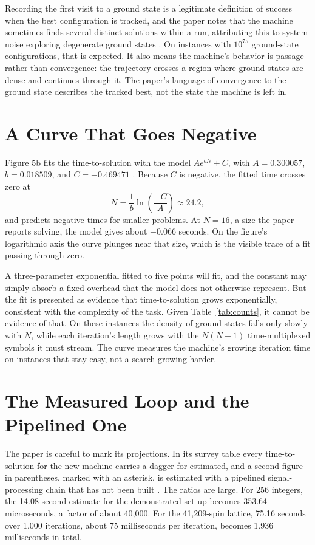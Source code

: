 \documentclass[11pt]{article}
\theoremstyle{definition}
\theoremstyle{remark}
\begin{document}
Recording the first visit to a ground state is a legitimate definition of success when the best configuration is tracked, and the paper notes that the machine sometimes finds several distinct solutions within a run, attributing this to system noise exploring degenerate ground states \cite{alkayed2025}. On instances with $10^{75}$ ground-state configurations, that is expected. It also means the machine's behavior is passage rather than convergence: the trajectory crosses a region where ground states are dense and continues through it. The paper's language of convergence to the ground state describes the tracked best, not the state the machine is left in.

\section{A Curve That Goes Negative}

Figure 5b fits the time-to-solution with the model $A e^{bN} + C$, with $A = 0.300057$, $b = 0.018509$, and $C = -0.469471$ \cite{alkayed2025}. Because $C$ is negative, the fitted time crosses zero at
\begin{equation}
N = \frac{1}{b}\ln\!\left(\frac{-C}{A}\right) \approx 24.2,
\end{equation}
and predicts negative times for smaller problems. At $N = 16$, a size the paper reports solving, the model gives about $-0.066$ seconds. On the figure's logarithmic axis the curve plunges near that size, which is the visible trace of a fit passing through zero.

A three-parameter exponential fitted to five points will fit, and the constant may simply absorb a fixed overhead that the model does not otherwise represent. But the fit is presented as evidence that time-to-solution grows exponentially, consistent with the complexity of the task. Given Table~\ref{tab:counts}, it cannot be evidence of that. On these instances the density of ground states falls only slowly with $N$, while each iteration's length grows with the $N(N+1)$ time-multiplexed symbols it must stream. The curve measures the machine's growing iteration time on instances that stay easy, not a search growing harder.

\section{The Measured Loop and the Pipelined One}

The paper is careful to mark its projections. In its survey table every time-to-solution for the new machine carries a dagger for estimated, and a second figure in parentheses, marked with an asterisk, is estimated with a pipelined signal-processing chain that has not been built \cite{alkayed2025}. The ratios are large. For 256 integers, the 14.08-second estimate for the demonstrated set-up becomes 353.64 microseconds, a factor of about 40,000. For the 41,209-spin lattice, 75.16 seconds over 1,000 iterations, about 75 milliseconds per iteration, becomes 1.936 milliseconds in total.
\end{document}
